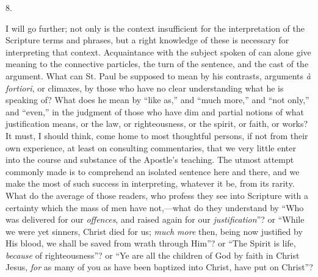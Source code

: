 8.

I will go further; not only is the context insufficient for the
interpretation of the Scripture terms and phrases, but a right
knowledge of these is necessary for interpreting that context.
Acquaintance with the subject spoken of can alone give meaning to the
connective particles, the turn of the sentence, and the cast of the
argument. What can St. Paul be supposed to mean by his contrasts,
arguments \emph{à fortiori}, or climaxes, by those who have no clear
understanding what he is speaking of? What does he mean by ``like
as,'' and ``much more,'' and ``not only,'' and
``even,'' in the judgment of those who have dim and partial
notions of what justification means, or the law, or righteousness, or
the spirit, or faith, or works? It must, I should think, come home to
most thoughtful persons, if not from their own experience, at
least on consulting commentaries, that we very little enter into the
course and substance of the Apostle's teaching. The utmost attempt
commonly made is to comprehend an isolated sentence here and there,
and we make the most of such success in interpreting, whatever it be,
from its rarity. What do the average of those readers, who profess
they see into Scripture with a certainty which the mass of men have
not,—what do they understand by ``Who was delivered for our \emph{offences},
and raised again for our \emph{justification}''? or ``While we
were yet sinners, Christ died for us; \emph{much more} then, being now
justified by His blood, we shall be saved from wrath through
Him''? or ``The Spirit is life, \emph{because} of
righteousness''? or ``Ye are all the children of God by faith
in Christ Jesus, \emph{for} as many of you as have been baptized into
Christ, have put on Christ''?

